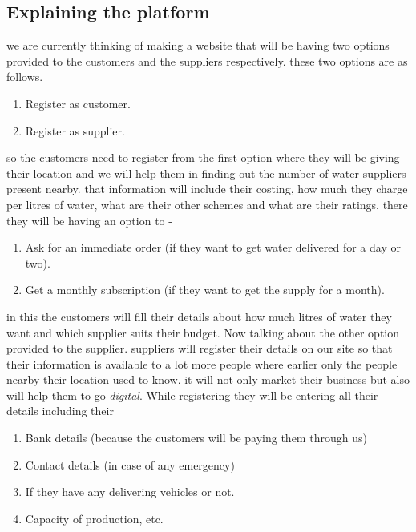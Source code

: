 \documentclass[a4paper, 12pt]{article}
\begin{document}
\subsection[short]{Explaining the platform}
we are currently thinking of making a website that will be having two options provided to the customers and the suppliers respectively.
these two options are as follows.
\begin{enumerate}
    \item Register as customer.
    \item Register as supplier.
\end{enumerate}
so the customers need to register from the first option where they will be giving their location and we will help them in finding
out the number of water suppliers present nearby. that information will include their costing, how much they charge per litres of water,
what are their other schemes and what are their ratings. there they will be having an option to -
\begin{enumerate}
    \item Ask for an immediate order (if they want to get water delivered for a day or two).
    \item Get a monthly subscription (if they want to get the supply for a month).
\end{enumerate}
in this the customers will fill their details about how much litres of water they want and which supplier suits their budget. Now talking about the other option provided
to the supplier. suppliers will register their details on our site so that their information is available to a lot more people where earlier only the people nearby their
location used to know. it will not only market their business but also will help them to go \textit{digital}. While registering they will be entering all their details
including their
\begin{enumerate}
    \item Bank details (because the customers will be paying them through us)
    \item Contact details (in case of any emergency)
    \item If they have any delivering vehicles or not.
    \item Capacity of production, etc.
\end{enumerate}
\end{document}
